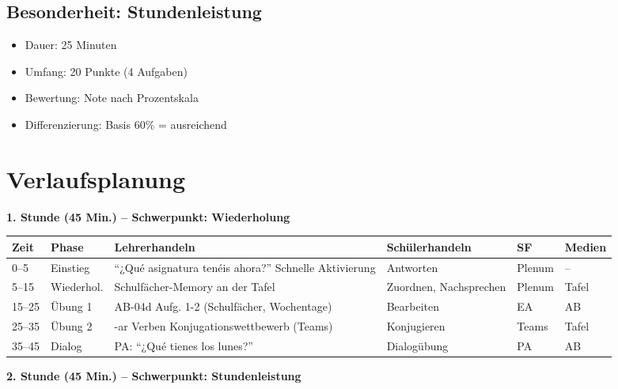 \documentclass[11pt,a4paper]{article}
\begin{document}
\subsection{Besonderheit: Stundenleistung}
\begin{itemize}
    \item Dauer: 25 Minuten
    \item Umfang: 20 Punkte (4 Aufgaben)
    \item Bewertung: Note nach Prozentskala
    \item Differenzierung: Basis 60\% = ausreichend
\end{itemize}

\section{Verlaufsplanung}

\textbf{1. Stunde (45 Min.) -- Schwerpunkt: Wiederholung}

\begin{longtable}{|p{1cm}|p{1.5cm}|p{4cm}|p{3cm}|p{2cm}|p{2cm}|}
\hline
\textbf{Zeit} & \textbf{Phase} & \textbf{Lehrerhandeln} & \textbf{Schülerhandeln} & \textbf{SF} & \textbf{Medien} \\
\hline
\endhead

0--5 & Einstieg & ``¿Qué asignatura tenéis ahora?'' Schnelle Aktivierung & Antworten & Plenum & -- \\
\hline

5--15 & Wiederhol. & Schulfächer-Memory an der Tafel & Zuordnen, Nachsprechen & Plenum & Tafel \\
\hline

15--25 & Übung 1 & AB-04d Aufg. 1-2 (Schulfächer, Wochentage) & Bearbeiten & EA & AB \\
\hline

25--35 & Übung 2 & -ar Verben Konjugationswettbewerb (Teams) & Konjugieren & Teams & Tafel \\
\hline

35--45 & Dialog & PA: ``¿Qué tienes los lunes?'' & Dialogübung & PA & AB \\
\hline
\end{longtable}

\vspace{1em}

\textbf{2. Stunde (45 Min.) -- Schwerpunkt: Stundenleistung}
\end{document}
